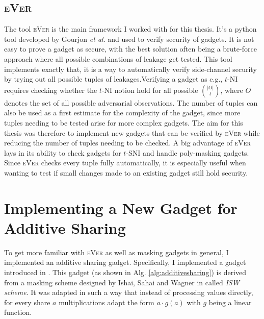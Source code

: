 \documentclass[english, version-2020-11]{uzl-thesis}
\makeatletter
\newcommand{\toolname}[1]{\textsc{#1}}
\newcommand{\etal}[0]{\textit{et al}\@.\xspace}
\makeatother
\begin{document}
    \section{\toolname{eVer}}
    The tool \toolname{eVer} is the main framework I worked with for this thesis. It's a python tool developed by Gourjon \etal and used to verify security of gadgets.
    It is not easy to prove a gadget as secure, with the best solution often being a brute-force approach where all possible combinations of leakage get tested. This tool implements exactly that, it is a way to automatically verify side-channel security by trying out all possible tuples of leakages.Verifying a gadget as e.g., $t$-NI requires checking whether the $t$-NI notion hold for all possible $\binom{|O|}{t}$, where $O$ denotes the set of all possible adversarial observations. The number of tuples can also be used as a first estimate for the complexity of the gadget, since more tuples needing to be tested arise for more complex gadgets. The aim for this thesis was therefore to implement new gadgets that can be verified by \toolname{eVer} while reducing the number of tuples needing to be checked. A big advantage of \toolname{eVer} lays in its ability to check gadgets for $t$-SNI and handle poly-masking gadgets.
    Since \toolname{eVer} checks every tuple fully automatically, it is especially useful when wanting to test if small changes made to an existing gadget still hold security.



%
%
  \chapter{Implementing a New Gadget for Additive Sharing}
  \label{ch:additive}

  To get more familiar with \toolname{eVer} as well as masking gadgets in general, I implemented an additive sharing gadget. Specifically, I implemented a gadget introduced in \cite{Coron2015}. This gadget (as shown in Alg. \ref{alg:additivesharing}) is derived from a masking scheme designed by Ishai, Sahai and Wagner in \cite{IshaiCircuits} called \emph{ISW scheme}. It was adapted in such a way that instead of processing values directly, for every share $a$ multiplications adapt the form $a \cdot g(a)$ with $g$ being a linear function.
\end{document}
